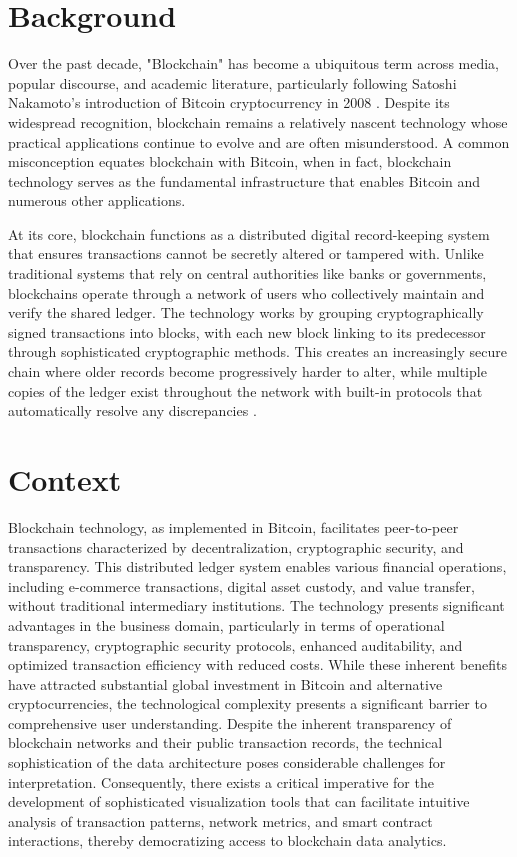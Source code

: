 
\section{Background}
Over the past decade, "Blockchain" has become a ubiquitous term across media, popular discourse, and academic literature, particularly following Satoshi Nakamoto's introduction of Bitcoin cryptocurrency in 2008 \cite{wright2008bitcoin}. Despite its widespread recognition, blockchain remains a relatively nascent technology whose practical applications continue to evolve and are often misunderstood. A common misconception equates blockchain with Bitcoin, when in fact, blockchain technology serves as the fundamental infrastructure that enables Bitcoin and numerous other applications.

At its core, blockchain functions as a distributed digital record-keeping system that ensures transactions cannot be secretly altered or tampered with. Unlike traditional systems that rely on central authorities like banks or governments, blockchains operate through a network of users who collectively maintain and verify the shared ledger. The technology works by grouping cryptographically signed transactions into blocks, with each new block linking to its predecessor through sophisticated cryptographic methods. This creates an increasingly secure chain where older records become progressively harder to alter, while multiple copies of the ledger exist throughout the network with built-in protocols that automatically resolve any discrepancies \cite{yaga2018blockchain}.

\section{Context}
Blockchain technology, as implemented in Bitcoin, facilitates peer-to-peer transactions characterized by decentralization, cryptographic security, and transparency. This distributed ledger system enables various financial operations, including e-commerce transactions, digital asset custody, and value transfer, without traditional intermediary institutions. The technology presents significant advantages in the business domain, particularly in terms of operational transparency, cryptographic security protocols, enhanced auditability, and optimized transaction efficiency with reduced costs. While these inherent benefits have attracted substantial global investment in Bitcoin and alternative cryptocurrencies, the technological complexity presents a significant barrier to comprehensive user understanding. Despite the inherent transparency of blockchain networks and their public transaction records, the technical sophistication of the data architecture poses considerable challenges for interpretation. Consequently, there exists a critical imperative for the development of sophisticated visualization tools that can facilitate intuitive analysis of transaction patterns, network metrics, and smart contract interactions, thereby democratizing access to blockchain data analytics.